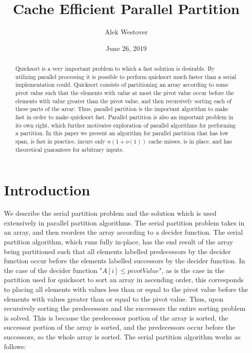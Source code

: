 \documentclass[twocolumn, twoside, 12pt]{article}
\author{\vspace{-2ex}Alek Westover\vspace{-2ex}}
\title{\vspace{-8ex}Cache Efficient Parallel Partition\vspace{-2ex}}
\date{\vspace{-2ex}June 26, 2019\vspace{-2ex}}
\renewcommand{\paragraph}[1]{\vspace{0.09in}\noindent{\bf \boldmath #1.}}
\begin{document}
\maketitle
\begin{abstract}
Quicksort is a very important problem to which a fast solution is desirable. 
By utilizing parallel processing it is possible to perform quicksort much faster than a serial implementation could. 
Quicksort consists of partitioning an array according to some pivot value such that the elements with value at most the pivot value occur before the elements with value greater than the pivot value, and then recursively sorting each of these parts of the array. 
Thus, parallel partition is the important algorithm to make fast in order to make quicksort fast. 
Parallel partition is also an important problem in its own right, which further motivates exploration of parallel algorithms for performing a partition. 
	In this paper we present an algorithm for parallel partition that has low span, is fast in practice, incurs only $n(1+o(1))$ cache misses, is in place, and has theoretical guarantees for arbitrary inputs.
\end{abstract}

\section{Introduction}
\paragraph{Serial Partition Problem}
We describe the serial partition problem and the solution which is used extensively in parallel partition algorithms. 
The serial partition problem takes in an array, and then reorders the array according to a decider function.
The serial partition algorithm, which runs fully in-place, has the end result of the array being partitioned such that all elements labelled predecessors by the decider function occur before the elements labelled successors by the decider function.
In the case of the decider function "$A[i] \leq pivotValue$", as is the case in the partition used for quicksort to sort an array in ascending order, this corresponds to placing all elements with values less than or equal to the pivot value before the elements with values greater than or equal to the pivot value.
Thus, upon recursively sorting the predecessors and the successors the entire sorting problem is solved. This is because the predecessor portion of the array is sorted, the successor portion of the array is sorted, and the predecessors occur before the successors, so the whole array is sorted.
The serial partition algorithm works as follows: 
\end{document}
